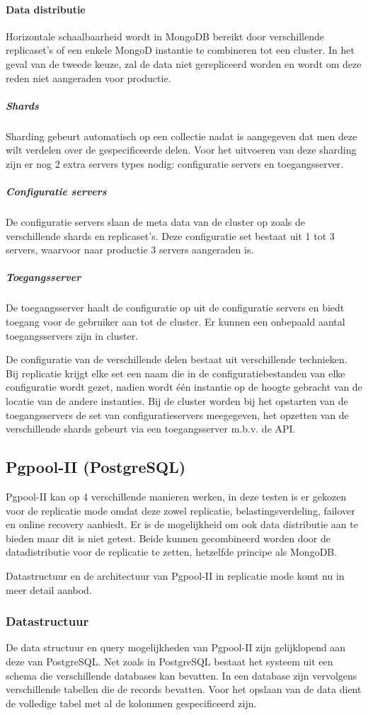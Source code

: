 \paragraph{Data distributie\cite{mongodb-shard}} Horizontale schaalbaarheid wordt in MongoDB bereikt door verschillende replicaset's of een enkele MongoD instantie te combineren tot een cluster. In het geval van de tweede keuze, zal de data niet gerepliceerd worden en wordt om deze reden niet aangeraden voor productie. 
\subparagraph{Shards} Sharding gebeurt automatisch op een collectie nadat is aangegeven dat men deze wilt verdelen over de gespecificeerde delen. Voor het uitvoeren van deze sharding zijn er nog 2 extra servers types nodig: configuratie servers en toegangsserver. 
\subparagraph{Configuratie servers} De configuratie servers slaan de meta data van de cluster op zoals de verschillende shards en replicaset's. Deze configuratie set bestaat uit 1 tot 3 servers, waarvoor naar productie 3 servers aangeraden is.
\subparagraph{Toegangsserver} De toegangsserver haalt de configuratie op uit de configuratie servers en biedt toegang voor de gebruiker aan tot de cluster. Er kunnen een onbepaald aantal toegangsservers zijn in cluster. 

De configuratie van de verschillende delen bestaat uit verschillende technieken. Bij replicatie krijgt elke set een naam die in de configuratiebestanden van elke configuratie wordt gezet, nadien wordt één instantie op de hoogte gebracht van de locatie van de andere instanties. Bij de cluster worden bij het opstarten van de toegangsservers de set van configuratieservers meegegeven, het opzetten van de verschillende shards gebeurt via een toegangsserver m.b.v. de API. 

\subsection{Pgpool-II (PostgreSQL)\cite{pgpool-doc}}
Pgpool-II kan op 4 verschillende manieren werken, in deze testen is er gekozen voor de replicatie mode omdat deze zowel replicatie, belastingsverdeling, failover en online recovery aanbiedt. Er is de mogelijkheid om ook data distributie aan te bieden maar dit is niet getest. Beide kunnen gecombineerd worden door de datadistributie voor de replicatie te zetten, hetzelfde principe als MongoDB. 

Datastructuur en de architectuur van Pgpool-II in replicatie mode komt nu in meer detail aanbod. 

\subsubsection{Datastructuur}
De data structuur en query mogelijkheden van Pgpool-II zijn gelijklopend aan deze van PostgreSQL. Net zoals in PostgreSQL bestaat het systeem uit een schema die verschillende databases kan bevatten. In een database zijn vervolgens verschillende tabellen die de records bevatten. Voor het opslaan van de data dient de volledige tabel met al de kolommen gespecificeerd zijn. 

